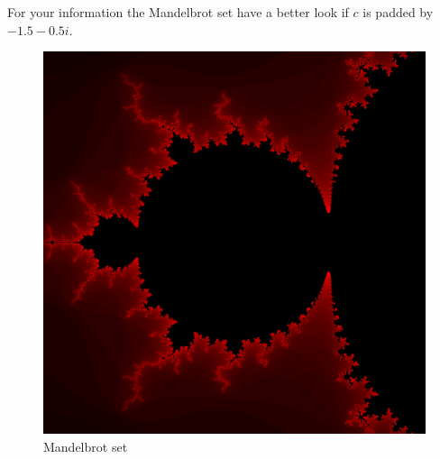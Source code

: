 \documentclass{article}
\begin{document}
For your information the Mandelbrot set have a better look if $c$ is padded by $-1.5 - 0.5i$.

\begin{figure}[H]
	\centering
	\includegraphics[scale=0.4]{figures/Mandelbrot.png}
	\caption{Mandelbrot set}
\end{figure}
\end{document}

